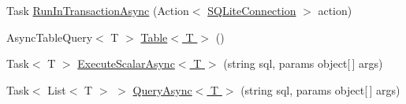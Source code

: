 \begin{DoxyCompactItemize}
\item 
Task \hyperlink{class_s_q_lite_1_1_s_q_lite_async_connection_a0d8abe01ee8f0afe93b6a38423d77029}{Run\+In\+Transaction\+Async} (Action$<$ \hyperlink{class_s_q_lite_1_1_s_q_lite_connection}{S\+Q\+Lite\+Connection} $>$ action)
\item 
Async\+Table\+Query$<$ T $>$ \hyperlink{class_s_q_lite_1_1_s_q_lite_async_connection_ae222dcdcc5033294c43c9cef1b16fbe1}{Table$<$ T $>$} ()
\item 
Task$<$ T $>$ \hyperlink{class_s_q_lite_1_1_s_q_lite_async_connection_adae67f753b244b754cc33be48cafbf67}{Execute\+Scalar\+Async$<$ T $>$} (string sql, params object\mbox{[}$\,$\mbox{]} args)
\item 
Task$<$ List$<$ T $>$ $>$ \hyperlink{class_s_q_lite_1_1_s_q_lite_async_connection_a8a81a54a5769d761562d9a3ce18b0f57}{Query\+Async$<$ T $>$} (string sql, params object\mbox{[}$\,$\mbox{]} args)
\end{DoxyCompactItemize}


